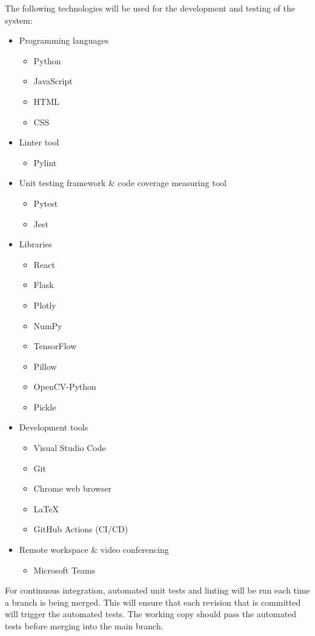 \documentclass{article}
\begin{document}
The following technologies will be used for the development and testing of the system:
\begin{itemize}
	\item Programming languages
	\begin{itemize}
		\item Python
		\item JavaScript
		\item HTML
		\item CSS
	\end{itemize}
	\item Linter tool
	\begin{itemize}
		\item Pylint
	\end{itemize}
	\item Unit testing framework \& code coverage measuring tool
	\begin{itemize}
		\item Pytest
		\item Jest
	\end{itemize}
	\item Libraries
	\begin{itemize}
		\item React
		\item Flask
		\item Plotly
		\item NumPy
		\item TensorFlow
		\item Pillow
		\item OpenCV-Python
		\item Pickle
	\end{itemize}
	\item Development tools
	\begin{itemize}
		\item Visual Studio Code
		\item Git
		\item Chrome web browser
		\item \LaTeX
		\item GitHub Actions (CI/CD)
	\end{itemize}
	\item Remote workspace \& video conferencing
	\begin{itemize}
		\item Microsoft Teams
	\end{itemize}
\end{itemize}

For continuous integration, automated unit tests and linting will be run each time a branch is being merged. This will ensure that each revision that is committed will trigger the automated tests. The working copy should pass the automated tests before merging into the main branch. 
\end{document}
